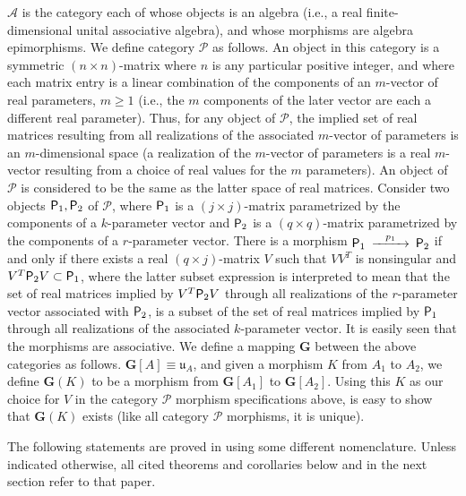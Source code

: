 \documentclass{amsart}
\numberwithin{equation}{section}
\theoremstyle{definition}
\numberwithin{theorem}{section}
\begin{document}
$\mathcal{A}$ is the category each of whose objects is an algebra (i.e., a real finite-dimensional unital associative algebra), and whose morphisms are algebra epimorphisms.  We define category $\mathcal{P}$ as follows. An object in this category is a symmetric $(n\times n)$-matrix where $n$ is any particular positive integer, and where each matrix entry is a linear combination of the components of an $m$-vector of real parameters, $m\ge 1$ (i.e., the $m$ components of the later vector are each a different real parameter).  Thus, for any object of $\mathcal{P}$, the implied set of real matrices resulting from all realizations of the associated $m$-vector of parameters is an $m$-dimensional space (a realization of the $m$-vector of parameters is a real $m$-vector resulting from a choice of real values for the $m$ parameters).  An object of $\mathcal{P}$ is considered to be the same as the latter space of real matrices.  Consider two objects ${\sf P}_1,{\sf P}_2$ of $\mathcal{P}$, where ${\sf P}_1$ is a $(j\times j)$-matrix parametrized by the components of a $k$-parameter vector and ${\sf P}_2$ is a $(q\times q)$-matrix parametrized by the components of a $r$-parameter vector.  There is a morphism $ \begin{CD}  {\sf P}_1 @>p_1>> {\sf P}_2\end{CD}$ if and only if  there exists a real $(q\times j)$-matrix $V$ such that $VV^T$ is nonsingular and $V^T{\sf P}_2V\subset {\sf P}_1$, where the latter subset expression 
is interpreted to mean that the set of real matrices implied by $V^T{\sf P}_2V$ through all realizations of the $r$-parameter vector associated with ${\sf P}_2$, is a subset of  the set of real matrices implied by  ${\sf P}_1$ through all realizations of the associated $k$-parameter vector.  It is easily seen that the morphisms are associative.  We define a mapping $\mathbf{G}$ between the above categories as follows.  $\mathbf{G}[
A] \equiv \mathfrak{u}_A$, and given a morphism $K$ from $A_1$ to $A_2$, we define $\mathbf{G}(K)$ to be a morphism from $\mathbf{G}[A_1]$ to $\mathbf{G}[A_2]$.  Using this $K$ as our choice for $V$ in the category $\mathcal{P}$ morphism specifications above, is easy to show that $\mathbf{G}(K)$ exists (like all category $\mathcal{P}$ morphisms, it is unique).

 The following statements are proved in \cite{fgreensite:2023} using some different nomenclature.  Unless indicated otherwise, all cited theorems and corollaries below and in the next section refer to that paper.
\end{document}
